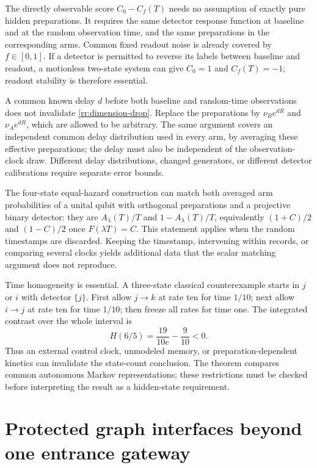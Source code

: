 The directly observable score $C_0-C_f(T)$ needs no assumption of exactly
pure hidden preparations. It requires the same detector response function at
baseline and at the random observation time, and the same preparations in the
corresponding arms. Common fixed readout noise is already covered by
$f\in[0,1]$. If a detector is permitted to reverse its labels between baseline
and readout, a motionless two-state system can give $C_0=1$ and $C_f(T)=-1$;
readout stability is therefore essential.

A common known delay $d$ before both baseline and random-time observations does
not invalidate \eqref{rr:dimension-drop}. Replace the preparations by
$\nu_B e^{dR}$ and $\nu_A e^{dR}$, which are allowed to be arbitrary. The same
argument covers an independent common delay distribution used in every arm,
by averaging these effective preparations; the delay must also be independent
of the observation-clock draw. Different delay distributions,
changed generators, or different detector calibrations require separate error
bounds.

The four-state equal-hazard construction can match both averaged arm
probabilities of a unital qubit with orthogonal preparations and a projective
binary detector: they are $A_\lambda(T)/T$ and $1-A_\lambda(T)/T$, equivalently
$(1+C)/2$ and $(1-C)/2$ once $F(\lambda T)=C$. This statement applies when the
random timestamps are discarded. Keeping the timestamp, intervening within
records, or comparing several clocks yields additional data that the scalar
matching argument does not reproduce.

Time homogeneity is essential. A three-state classical counterexample starts
in $j$ or $i$ with detector $\{j\}$. First allow $j\to k$ at rate ten for time
$1/10$; next allow $i\to j$ at rate ten for time $1/10$; then freeze all rates
for time one. The integrated contrast over the whole interval is
\[
 H(6/5)=\frac{19}{10e}-\frac9{10}<0.
\]
Thus an external control clock, unmodeled memory, or preparation-dependent
kinetics can invalidate the state-count conclusion. The theorem compares
common autonomous Markov representations; these restrictions must be checked
before interpreting the result as a hidden-state requirement.

\section{Protected graph interfaces beyond one entrance gateway}

